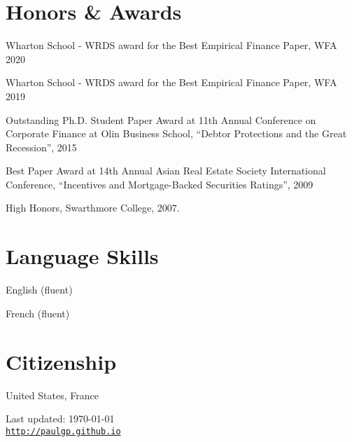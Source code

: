 \documentclass[letterpaper]{article}
\renewenvironment{itemize}{
  \begin{list}{}
    { \setlength{\itemsep}{5pt}
      \setlength{\parsep}{0pt}
      \setlength{\topsep}{0pt}
      \setlength{\leftmargin}{0em} } }{
  \end{list}}
\begin{document}
\section*{Honors \& Awards}
\begin{itemize}
\item Wharton School - WRDS award for the Best Empirical Finance Paper, WFA 2020
\item Wharton School - WRDS award for the Best Empirical Finance Paper, WFA 2019
\item Outstanding Ph.D. Student Paper Award at 11th Annual Conference
  on Corporate Finance at Olin Business School, ``Debtor Protections
  and the Great Recession'', 2015
\item Best Paper Award at 14th Annual Asian Real Estate Society
  International Conference, ``Incentives and Mortgage-Backed
  Securities Ratings'', 2009
\item High Honors, Swarthmore College, 2007.
\end{itemize}

\section*{Language Skills}
\begin{itemize}
\item English (fluent)
\item French (fluent)
\end{itemize}
\bigskip

\section*{Citizenship}
United States, France
\begin{center}
\begin{footnotesize}
Last updated: \today \\
\href{http://paulgp.github.io}{\tt http://paulgp.github.io}
\end{footnotesize}
\end{center}
\end{document}
